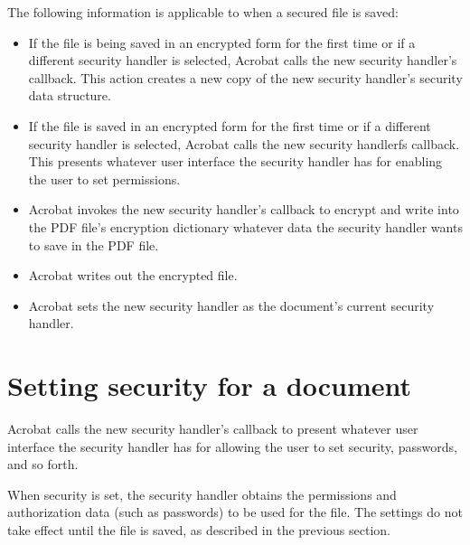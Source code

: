 \documentclass[letterpaper,12pt,english,openany,oneside]{sphinxmanual}
\begin{document}
The following information is applicable to when a secured file is saved:
\begin{itemize}
\item {} 
If the file is being saved in an encrypted form for the first time or if a different security handler is selected, Acrobat calls the new security handler’s  callback. This action creates a new copy of the new security handler’s security data structure.

\item {} 
If the file is saved in an encrypted form for the first time or if a different security handler is selected, Acrobat calls the new security handlerfs  callback. This presents whatever user interface the security handler has for enabling the user to set permissions.

\item {} 
Acrobat invokes the new security handler’s  callback to encrypt and write into the PDF file’s encryption dictionary whatever data the security handler wants to save in the PDF file.

\item {} 
Acrobat writes out the encrypted file.

\item {} 
Acrobat sets the new security handler as the document’s current security handler.

\end{itemize}


\section{Setting security for a document}
\label{\detokenize{Plugins_Security:setting-security-for-a-document}}
Acrobat calls the new security handler’s  callback to present whatever user interface the security handler has for allowing the user to set security, passwords, and so forth.

When security is set, the security handler obtains the permissions and authorization data (such as passwords) to be used for the file. The settings do not take effect until the file is saved, as described in the previous section.
\end{document}
